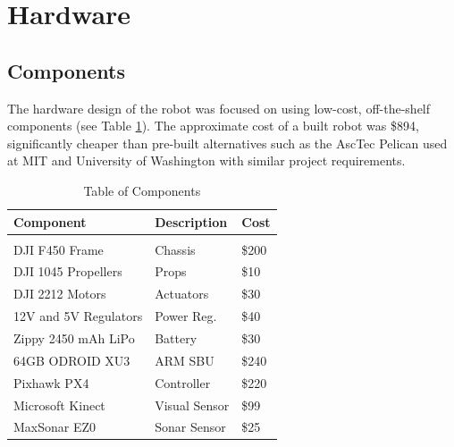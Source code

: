 \documentclass[letterpaper, oneside, 10pt]{report}
\begin{document}
\section{Hardware}

\subsection{Components}

The hardware design of the robot was focused on using low-cost, off-the-shelf components (see Table \ref{tbl: components.}). The approximate cost of a built robot was \$894, significantly cheaper than pre-built alternatives such as the AscTec Pelican used at MIT \cite{bachrach2011range} and University of Washington \cite{bachrach2012estimation} with similar project requirements.

\begin{table}[h!]
  \centering
  \caption{Table of Components}
  \vspace{2mm}
  \begin{tabular}{l l l}
    \hline \hline
    \vspace{-2mm}
    Component & \multicolumn{1}{l}{Description} & \multicolumn{1}{l}{Cost} \\ [1ex]
    \hline
    & \\
    DJI F450 Frame & Chassis & \$200 \\
    DJI 1045 Propellers & Props & \$10 \\
    DJI 2212 Motors & Actuators & \$30 \\
    12V and 5V Regulators & Power Reg. & \$40 \\
    Zippy 2450 mAh LiPo & Battery & \$30 \\
    64GB ODROID XU3 & ARM SBU & \$240 \\
    Pixhawk PX4 & Controller & \$220 \\
    Microsoft Kinect & Visual Sensor & \$99 \\
    MaxSonar EZ0	& Sonar Sensor & \$25 \\
  \end{tabular}
  \label{tbl: components.}
\end{table}
\end{document}
